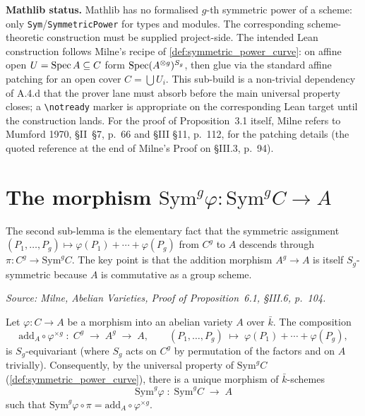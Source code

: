 \medskip

\textbf{Mathlib status.} Mathlib has no formalised \(g\)-th symmetric power of
a scheme: only \texttt{Sym}/\texttt{SymmetricPower} for types and modules.
The corresponding scheme-theoretic construction must be supplied
project-side. The intended Lean construction follows Milne's recipe of
\cref{def:symmetric_power_curve}: on affine open \(U = \operatorname{Spec} A \subseteq C\)
form \(\operatorname{Spec}(A^{\otimes g})^{S_g}\), then glue via the standard affine
patching for an open cover \(C = \bigcup U_i\). This sub-build is a
non-trivial dependency of A.4.d that the prover lane must absorb before the
main universal property closes; a \texttt{\textbackslash notready} marker is
appropriate on the corresponding Lean target until the construction lands.
For the proof of Proposition~3.1 itself, Milne refers to Mumford 1970,
\S II~\S 7, p.~66 and \S III \S 11, p.~112, for the patching details (the
quoted reference at the end of Milne's Proof on \S III.3, p.~94).

\section{The morphism \(\mathrm{Sym}^g \varphi \colon \mathrm{Sym}^g C \to A\)}
\label{sec:albaneseup_sym_g_av_map}

The second sub-lemma is the elementary fact that the symmetric assignment
\((P_1, \ldots, P_g) \mapsto \varphi(P_1) + \cdots + \varphi(P_g)\) from
\(C^g\) to \(A\) descends through \(\pi \colon C^g \to \mathrm{Sym}^g C\). The
key point is that the addition morphism \(A^g \to A\) is itself
\(S_g\)-symmetric because \(A\) is commutative as a group scheme.

\begin{lemma}
  \label{lem:symmetric_product_av_map}

  \textit{Source: Milne, \emph{Abelian Varieties}, Proof of Proposition~6.1,
  \S III.6, p.~104.}

  Let \(\varphi \colon C \to A\) be a morphism into an abelian variety \(A\)
  over \(\bar k\). The composition
  \[
    \mathrm{add}_A \circ \varphi^{\times g}
    \;\colon\; C^g \;\longrightarrow\; A^g \;\longrightarrow\; A,
    \qquad (P_1, \ldots, P_g) \;\longmapsto\; \varphi(P_1) + \cdots + \varphi(P_g),
  \]
  is \(S_g\)-equivariant (where \(S_g\) acts on \(C^g\) by permutation of the
  factors and on \(A\) trivially). Consequently, by the universal property of
  \(\mathrm{Sym}^g C\) (\cref{def:symmetric_power_curve}), there is a unique
  morphism of \(\bar k\)-schemes
  \[
    \mathrm{Sym}^g \varphi \;\colon\; \mathrm{Sym}^g C \;\longrightarrow\; A
  \]
  such that
  \(\mathrm{Sym}^g \varphi \circ \pi = \mathrm{add}_A \circ \varphi^{\times g}\).
\end{lemma}

